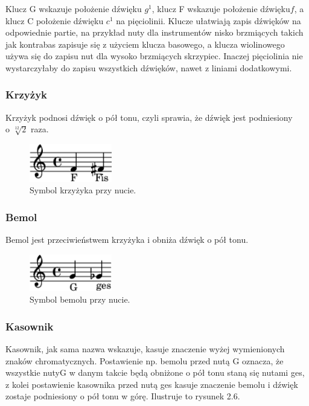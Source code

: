 \documentclass[printmode, eng, openany]{mgr}
\newcommand\tab[1][1cm]{\hspace*{#1}}
\begin{document}
\tab Klucz G wskazuje położenie dźwięku $g^{1}$, klucz F wskazuje położenie dźwięku\linebreak$f$, a klucz C położenie dźwięku $c^{1}$ na pięciolinii. Klucze ułatwiają zapis dźwięków na odpowiednie partie, na przykład nuty dla instrumentów nisko brzmiących takich jak kontrabas zapisuje się z użyciem klucza basowego, a klucza wiolinowego używa się do zapisu nut dla wysoko brzmiących skrzypiec. Inaczej pięciolinia nie wystarczyłaby do zapisu wszystkich dźwięków, nawet z liniami dodatkowymi. \cite{key}

\subsubsection{Krzyżyk}
\tab Krzyżyk podnosi dźwięk o pół tonu, czyli sprawia, że dźwięk jest podniesiony\\o $\sqrt[12]{2}$ raza. \cite{slow}
\begin{figure}[!htb]
\centering
\includegraphics[width=3.6cm]{krzyzyk.png}
\caption{Symbol krzyżyka przy nucie.}
\end{figure}

\subsubsection{Bemol}
\tab Bemol jest przeciwieństwem krzyżyka i obniża dźwięk o pół tonu. \cite{slow}
\begin{figure}[!htb]
\centering
\includegraphics[width=3.6cm]{bemol.png}
\caption{Symbol bemolu przy nucie.}
\end{figure}

\subsubsection{Kasownik}
\tab Kasownik, jak sama nazwa wskazuje, kasuje znaczenie wyżej wymienionych znaków chromatycznych. Postawienie np. bemolu przed nutą G oznacza, że wszystkie nuty\linebreak G w danym takcie będą obniżone o pół tonu staną się nutami ges, z kolei postawienie kasownika przed nutą ges kasuje znaczenie bemolu i dźwięk zostaje podniesiony o pół tonu w górę. \cite{slow} Ilustruje to rysunek 2.6.
\end{document}
